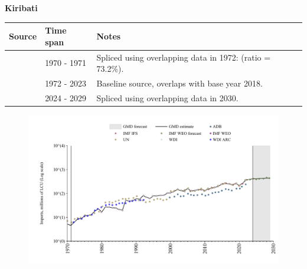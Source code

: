 \documentclass[12pt,a4paper,landscape]{article}
\begin{document}
\begin{adjustbox}{max totalsize={\paperwidth}{\paperheight},center}
\begin{minipage}[t][\textheight][t]{\textwidth}
\vspace*{0.5cm}
{}
\begin{center}
{\Large\bfseries Kiribati}
\end{center}
\vspace{0.5cm}
\begin{table}[H]
\centering
\small
\begin{tabular}{|l|l|l|}
\hline
\textbf{Source} & \textbf{Time span} & \textbf{Notes} \\
\hline
\rowcolor{white}\cite{UN}& 1970 - 1971 &Spliced using overlapping data in 1972: (ratio = 73.2\%).\\
\rowcolor{lightgray}\cite{WDI}& 1972 - 2023 &Baseline source, overlaps with base year 2018.\\
\rowcolor{white}\cite{IMF_WEO_forecast}& 2024 - 2029 &Spliced using overlapping data in 2030.\\
\hline
\end{tabular}
\end{table}
\begin{figure}[H]
\centering
\includegraphics[width=\textwidth,height=0.6\textheight,keepaspectratio]{graphs/KIR_imports.pdf}
\end{figure}
\end{minipage}
\end{adjustbox}
\end{document}
